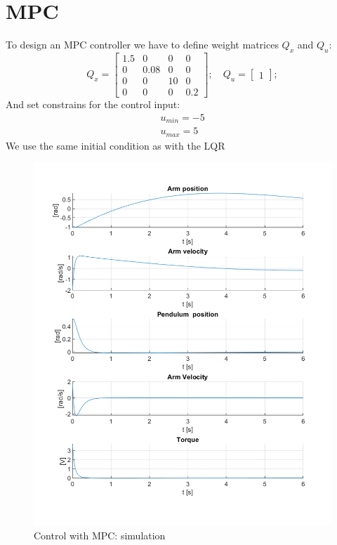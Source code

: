 \section{MPC}
To design an MPC controller we have to define weight matrices $Q_x$ and $Q_u$:
\begin{equation}
Q_x = \begin{bmatrix}
1.5&0&0&0\\
0&0.08&0&0\\
0&0&10&0\\
0&0&0&0.2
\end{bmatrix}; \quad Q_u = \begin{bmatrix}1\end{bmatrix};
\end{equation}
And set constrains for the control input:
\begin{equation}
	\begin{split}
	u_{min} = -5\\
	u_{max} = 5
	\end{split}
\end{equation}
We use the same initial condition as with the LQR
\begin{figure}[h]
	\centering
	\includegraphics[width=.6\linewidth]{images/MPC}
	\caption{Control with MPC: simulation}
	\label{mpc}
\end{figure}
\newpage
